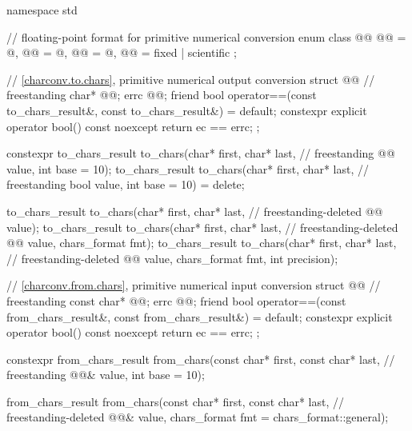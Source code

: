 %
\begin{codeblock}
namespace std {
  // floating-point format for primitive numerical conversion
  enum class @@ {
    @@ = @\unspec@,
    @@ = @\unspec@,
    @@ = @\unspec@,
    @@ = fixed | scientific
  };

  // \ref{charconv.to.chars}, primitive numerical output conversion
  struct @@ {                                              // freestanding
    char* @@;
    errc @@;
    friend bool operator==(const to_chars_result&, const to_chars_result&) = default;
    constexpr explicit operator bool() const noexcept { return ec == errc{}; }
  };

  constexpr to_chars_result to_chars(char* first, char* last,           // freestanding
                                     @@ value, int base = 10);
  to_chars_result to_chars(char* first, char* last,                     // freestanding
                           bool value, int base = 10) = delete;

  to_chars_result to_chars(char* first, char* last,                     // freestanding-deleted
                           @@ value);
  to_chars_result to_chars(char* first, char* last,                     // freestanding-deleted
                           @@ value, chars_format fmt);
  to_chars_result to_chars(char* first, char* last,                     // freestanding-deleted
                           @@ value, chars_format fmt, int precision);

  // \ref{charconv.from.chars}, primitive numerical input conversion
  struct @@ {                                            // freestanding
    const char* @@;
    errc @@;
    friend bool operator==(const from_chars_result&, const from_chars_result&) = default;
    constexpr explicit operator bool() const noexcept { return ec == errc{}; }
  };

  constexpr from_chars_result from_chars(const char* first, const char* last,   // freestanding
                                         @@& value, int base = 10);

  from_chars_result from_chars(const char* first, const char* last,     // freestanding-deleted
                               @@& value,
                               chars_format fmt = chars_format::general);
}
\end{codeblock}

